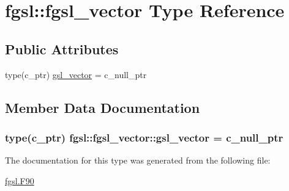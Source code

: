 \hypertarget{structfgsl_1_1fgsl__vector}{}\section{fgsl\+:\+:fgsl\+\_\+vector Type Reference}
\label{structfgsl_1_1fgsl__vector}
\subsection*{Public Attributes}
\begin{DoxyCompactItemize}
\item 
type(c\+\_\+ptr) \hyperlink{structfgsl_1_1fgsl__vector_abc58a30c78d6edb636f482c148a03b2b}{gsl\+\_\+vector} = c\+\_\+null\+\_\+ptr
\end{DoxyCompactItemize}


\subsection{Member Data Documentation}
\hypertarget{structfgsl_1_1fgsl__vector_abc58a30c78d6edb636f482c148a03b2b}{}
\subsubsection[{gsl\+\_\+vector}]{\setlength{\rightskip}{0pt plus 5cm}type(c\+\_\+ptr) fgsl\+::fgsl\+\_\+vector\+::gsl\+\_\+vector = c\+\_\+null\+\_\+ptr}\label{structfgsl_1_1fgsl__vector_abc58a30c78d6edb636f482c148a03b2b}


The documentation for this type was generated from the following file\+:\begin{DoxyCompactItemize}
\item 
\hyperlink{fgsl_8F90}{fgsl.\+F90}\end{DoxyCompactItemize}
